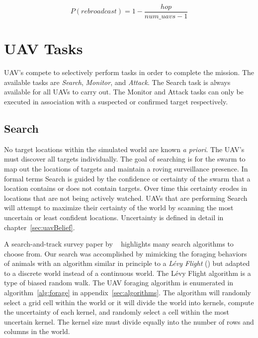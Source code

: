 \begin{equation}
\label{eq:probFlood}
P(rebroadcast) = 1 - \frac{hop}{num\_uavs - 1}
\end{equation}

\section{UAV Tasks}
UAV's compete to selectively perform tasks in order to complete the mission.  The available tasks are \textit{Search}, \textit{Monitor}, and \textit{Attack}.  The Search task is always available for all UAVs to carry out.  The Monitor and Attack tasks can only be executed in association with a suspected or confirmed target respectively.

\subsection{Search}
No target locations within the simulated world are known \textit{a priori}.  The UAV's must discover all targets individually.  The goal of searching is for the swarm to map out the locations of targets and maintain a roving surveillance presence. In formal terms Search is guided by the confidence or certainty of the swarm that a location contains or does not contain targets.  Over time this certainty erodes in locations that are not being actively watched.  UAVs that are performing Search will attempt to maximize their certainty of the world by scanning the most uncertain or least confident locations.  Uncertainty is defined in detail in chapter~\ref{sec:uavBelief}.

A search-and-track survey paper by ~\cite{senanayake} highlights many search algorithms to choose from. Our search was accomplished by mimicking the foraging behaviors of animals with an algorithm similar in principle to a \textit{L\'evy Flight} (\cite{humphries}) but adapted to a discrete world instead of a continuous world.  The L\'evy Flight algorithm is a type of biased random walk.  The UAV foraging algorithm is enumerated in algorithm~\ref{alg:forage} in appendix~\ref{sec:algorithms}.  The algorithm will randomly select a grid cell within the world or it will divide the world into kernels, compute the uncertainty of each kernel, and randomly select a cell within the most uncertain kernel.  The kernel size must divide equally into the number of rows and columns in the world. 

